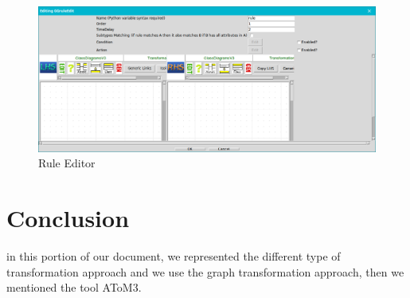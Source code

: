 \begin{figure}[th]
	\centering
 	\includegraphics[scale=0.38]{ch3/img/ruleEditor}
	\caption{\label{fig:Rule Editor}Rule Editor}
\end{figure} 

\section{Conclusion}
in this portion of our document, we represented the different type of transformation approach and we use the graph transformation approach, then we mentioned the tool AToM3.